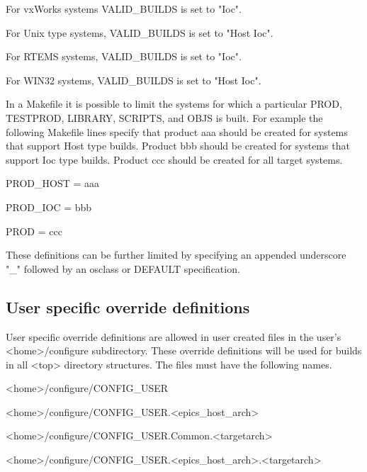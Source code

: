 For vxWorks systems VALID\_BUILDS is set to "Ioc".

For Unix type systems, VALID\_BUILDS is set to "Host Ioc".

For RTEMS systems, VALID\_BUILDS is set to "Ioc".

For WIN32 systems, VALID\_BUILDS is set to "Host Ioc".

In a Makefile it is possible to limit the systems for which a particular PROD, TESTPROD, LIBRARY, SCRIPTS, and 
OBJS is built. For example the following Makefile lines specify that product aaa should be created for systems that 
support Host type builds. Product bbb should be created for systems that support Ioc type builds. Product ccc should be 
created for all target systems.

\begin{description}\item PROD\_HOST = aaa

\item PROD\_IOC = bbb

\item PROD = ccc

\end{description}These definitions can be further limited by specifying an appended underscore "\_" followed by an osclass or DEFAULT 
specification.

\subsection{User specific override definitions}

User specific override definitions are allowed in user created files in the user's \textless{}home\textgreater{}/configure subdirectory. These 
override definitions will be used for builds in all \textless{}top\textgreater{} directory structures. The files must have the following names. 

\textless{}home\textgreater{}/configure/CONFIG\_USER

\textless{}home\textgreater{}/configure/CONFIG\_USER.\textless{}epics\_host\_arch\textgreater{}

\textless{}home\textgreater{}/configure/CONFIG\_USER.Common.\textless{}targetarch\textgreater{}

\textless{}home\textgreater{}/configure/CONFIG\_USER.\textless{}epics\_host\_arch\textgreater{}.\textless{}targetarch\textgreater{}

